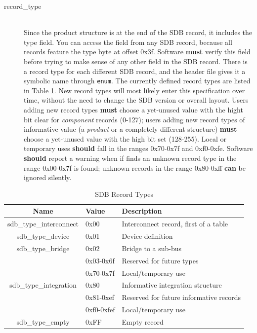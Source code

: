 \documentclass[a4paper, 12pt]{article}
\begin{document}
\begin{description}
\item[record\_type] \hfill \\
Since the product structure is at the end of the SDB record, it includes the
type field. You can access the field from any SDB record, because all records feature
the type byte at offset 0x3f.  Software \textbf{must} verify this field before trying to
make sense of any other field in the SDB record.
There is a record type for each different
SDB record, and the header file gives it a symbolic name through \texttt{enum}.
The currently defined record types are listed in Table \ref{record_type}.  New
record types will most likely enter this specification over time, without the need
to change the SDB version or overall layout.  Users adding new record types \textbf{must}
choose a yet-unused value with the hight bit clear for \textit{component} records (0-127);
users adding new record types of informative value (a \textit{product} or a completely
different structure) \textbf{must} choose a yet-unused value with the high bit set (128-255).
Local or temporary uses \textbf{should} fall in the ranges 0x70-0x7f and 0xf0-0xfe.
Software \textbf{should} report a warning when if finds an
unknown record type in the range 0x00-0x7f is found; unknown records in the range 0x80-0xff
\textbf{can} be ignored silently.
\end{description}

\begin{center}
  \begin{savenotes}
    \begin{table}[!ht]\footnotesize
      \caption{SDB Record Types}\label{record_type}\centering
        \begin{tabular}{| c | l | p{6cm} |} \hline
        Name & Value & Description \\ \hline
        sdb\_type\_interconnect & 0x00 & Interconnect record, first of a table \\ \hline
        sdb\_type\_device & 0x01 & Device definition \\ \hline
        sdb\_type\_bridge & 0x02 & Bridge to a sub-bus \\ \hline
        & 0x03-0x6f & Reserved for future types \\ \hline
        & 0x70-0x7f & Local/temporary use \\ \hline
        sdb\_type\_integration & 0x80 & Informative integration structure \\ \hline
        & 0x81-0xef & Reserved for future informative records \\ \hline
        & 0xf0-0xfef & Local/temporary use \\ \hline
        sdb\_type\_empty & 0xFF & Empty record \\ \hline
        \end{tabular}
    \end{table}
  \end{savenotes}
\end{center}
\end{document}
